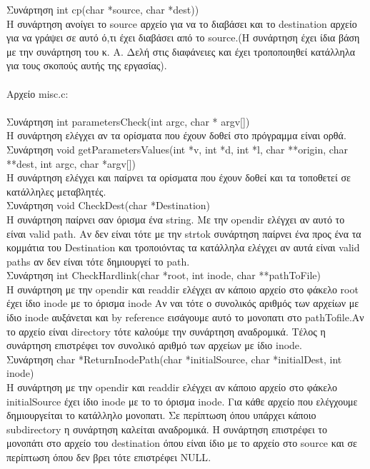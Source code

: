 \documentclass[10pt,a4]{article}
\newcommand{\la}{\latintext}
\begin{document}
\begin{itemize}
 	 Συνάρτηση  {\la int cp(char *source, char *dest))}\\
 	 H συνάρτηση ανοίγει το {\la source} αρχείο για να το διαβάσει και το {\la destination} αρχείο για να γράψει σε αυτό
 	 ό,τι έχει διαβάσει από το {\la source}.(H συνάρτηση έχει ίδια βάση με την συνάρτηση του κ. Α. Δελή στις διαφάνειες
 	 και έχει τροποποιηθεί κατάλληλα για τους σκοπούς αυτής της εργασίας).\\ \\
 	 
 	 {\sf Αρχείο {\la misc.c:}}\\ \\
 	 
 	  Συνάρτηση {\la int parametersCheck(int argc, char * argv[])}\\
 	  Η συνάρτηση ελέγχει αν τα ορίσματα που έχουν δοθεί στο πρόγραμμα είναι ορθά. \\
 	  
 	   Συνάρτηση {\la void getParametersValues(int *v, int *d, int *l, char **origin, char **dest, int argc, char *argv[])}\\
 	   Η συνάρτηση ελέγχει και παίρνει τα ορίσματα που έχουν δοθεί και τα τοποθετεί σε κατάλληλες μεταβλητές.\\
 	 
	   Συνάρτηση {\la void CheckDest(char *Destination)}\\
	   Η συνάρτηση παίρνει σαν όρισμα ένα {\la string}. Με την {\la opendir} ελέγχει αν αυτό το είναι {\la valid path}.
	   Αν δεν είναι τότε με την {\la strtok} συνάρτηση παίρνει ένα προς ένα τα κομμάτια του {\la Destination} και τροποιόντας
	   τα κατάλληλα ελέγχει αν αυτά είναι {\la valid paths} αν δεν είναι τότε δημιουργεί το {\la path}.\\
	   
 	 Συνάρτηση {\la int CheckHardlink(char *root, int inode, char **pathToFile)}\\
 	 H συνάρτηση με την {\la opendir} και {\la readdir} ελέγχει αν κάποιο αρχείο στο φάκελο {\la root} έχει ίδιο {\la inode}
 	 με το όρισμα {\la inode} Aν ναι τότε ο συνολικός αριθμός των αρχείων με ίδιο {\la inode} αυξάνεται και {\la by reference}
 	 εισάγουμε αυτό το μονοπατι στο {\la pathTofile}.Αν το αρχείο είναι {\la directory} τότε καλούμε την συνάρτηση αναδρομικά.
 	 Τέλος η συνάρτηση επιστρέφει τον συνολικό αριθμό των αρχείων με ίδιο {\la inode}.\\
 	 
 	  Συνάρτηση {\la char *ReturnInodePath(char *initialSource, char *initialDest, int inode)}\\
 	 H συνάρτηση με την {\la opendir} και {\la readdir} ελέγχει αν κάποιο αρχείο στο φάκελο {\la initialSource} έχει ίδιο {\la inode}
 	 με το το όρισμα {\la inode}. Για κάθε αρχείο που ελέγχουμε δημιουργείται το κατάλληλο μονοπατι. Σε περίπτωση όπου
 	 υπάρχει κάποιο {\la subdirectory} η συνάρτηση καλείται αναδρομικά. Η συνάρτηση επιστρέφει το μονοπάτι στο αρχείο
 	 του {\la destination} όπου είναι ίδιο με το αρχείο στο {\la source} και σε περίπτωση όπου δεν βρει τότε επιστρέφει
 	 {\la NULL}.	
	
\end{itemize}
\end{document}
